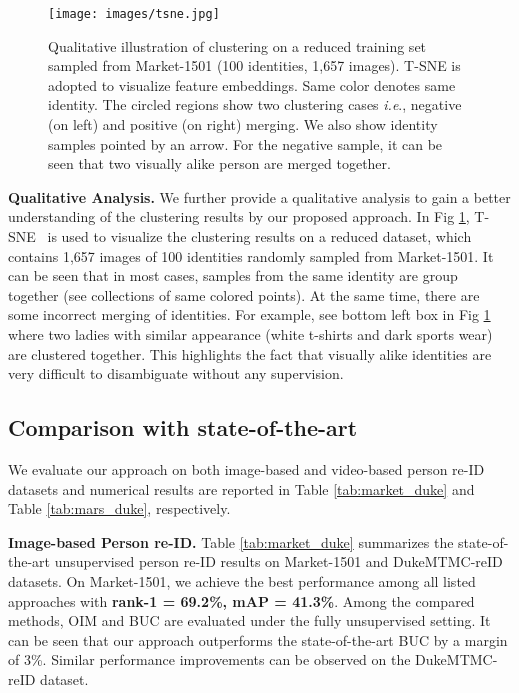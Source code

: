 \documentclass[journal]{IEEEtran}
\newcommand{\ie}{\textit{i.e}.}
\begin{document}
\begin{figure}[htb]
\begin{center}
    \centering
    \texttt{[image: images/tsne.jpg]}
    \caption{Qualitative illustration of clustering  on a reduced training set sampled from Market-1501 (100 identities, 1,657 images). T-SNE is adopted to visualize feature embeddings. Same color denotes same identity. The circled regions show two clustering cases \ie, negative (on left) and positive (on right) merging. We also show identity samples pointed by an arrow.  For the negative sample, it can be seen that two visually alike person are merged together.}
    \label{fig:tsne}
    \end{center}
\end{figure} 
\textbf{Qualitative Analysis.}
We further provide a qualitative analysis to gain a better understanding of the clustering results by our proposed approach. In Fig \ref{fig:tsne}, T-SNE~\cite{maaten2008visualizing} is used to visualize the clustering results on a reduced dataset, which contains 1,657 images of 100 identities randomly sampled from Market-1501. It can be seen that in most cases, samples from the same identity are group together (see collections of same colored points). At the same time, there are some incorrect merging of identities. For example, see bottom left box in Fig \ref{fig:tsne} where two ladies with similar appearance (white t-shirts and dark sports wear) are clustered together. This highlights the fact that  visually alike identities are very difficult to disambiguate without any supervision. 


\subsection{Comparison with state-of-the-art}
We evaluate our approach on both image-based and video-based person re-ID datasets and numerical results are reported in Table \ref{tab:market_duke} and Table \ref{tab:mars_duke}, respectively.

\textbf{Image-based Person re-ID.} Table \ref{tab:market_duke} summarizes the state-of-the-art unsupervised person re-ID results on Market-1501 and DukeMTMC-reID datasets. On Market-1501, we achieve the best performance among all listed approaches with \textbf{rank-1 = 69.2\%, mAP = 41.3\%}. Among the compared methods, OIM \cite{xiao2017joint} and BUC \cite{lin2019bottom} are evaluated under the fully unsupervised setting. It can be seen that our approach outperforms the state-of-the-art BUC by a margin of 3\%. Similar performance improvements can be observed on the DukeMTMC-reID dataset. 
\end{document}
